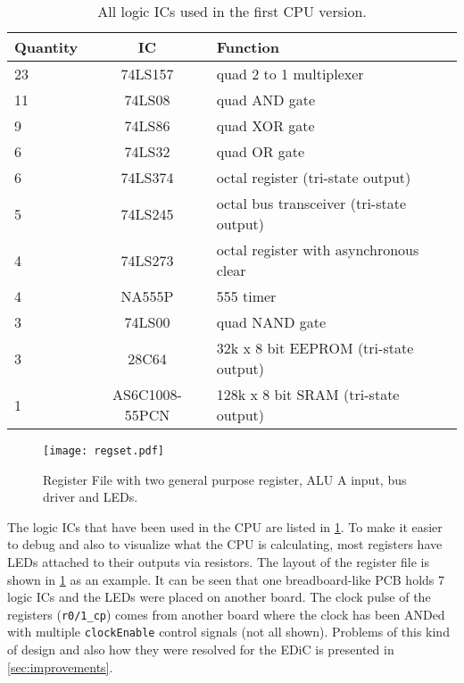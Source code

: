 \begin{table}
  \centering
  \renewcommand{\arraystretch}{1.25}
  \caption{All logic \glspl{IC} used in the first \gls{CPU} version.}
  \label{tab:cpuIcs}
  \begin{tabularx}{\textwidth}{ |l|c||X| }
    \hline
    Quantity & \gls{IC}       & Function                                 \\\hline\hline
    23       & 74LS157        & quad 2 to 1 multiplexer                  \\\hline
    11       & 74LS08         & quad AND gate                            \\\hline
    9        & 74LS86         & quad XOR gate                            \\\hline
    6        & 74LS32         & quad OR gate                             \\\hline
    6        & 74LS374        & octal register (tri-state output)        \\\hline
    5        & 74LS245        & octal bus transceiver (tri-state output) \\\hline
    4        & 74LS273        & octal register with asynchronous clear   \\\hline
    4        & NA555P         & 555 timer                                \\\hline
    3        & 74LS00         & quad NAND gate                           \\\hline
    3        & 28C64          & 32k x 8 bit EEPROM (tri-state output)    \\\hline
    1        & AS6C1008-55PCN & 128k x 8 bit SRAM (tri-state output)     \\\hline
  \end{tabularx}
\end{table}
\begin{figure}[t]
  \centering
  \texttt{[image: regset.pdf]}
  \caption{Register File with two general purpose register, \gls{ALU} A input, bus driver and LEDs.}
  \label{fig:regset}
\end{figure}
The logic \glspl{IC} that have been used in the \gls{CPU} are listed in \cref{tab:cpuIcs}.
To make it easier to debug and also to visualize what the \gls{CPU} is calculating, most registers have \glspl{LED} attached to their outputs via resistors.
The layout of the register file is shown in \cref{fig:regset} as an example.
It can be seen that one breadboard-like \gls{PCB} holds 7 logic \glspl{IC} and the \glspl{LED} were placed on another board.
The clock pulse of the registers (\texttt{r0/1\_cp}) comes from another board where the clock has been ANDed with multiple \texttt{clockEnable} control signals (not all shown).
Problems of this kind of design and also how they were resolved for the \gls{EDiC} is presented in \cref{sec:improvements}.


